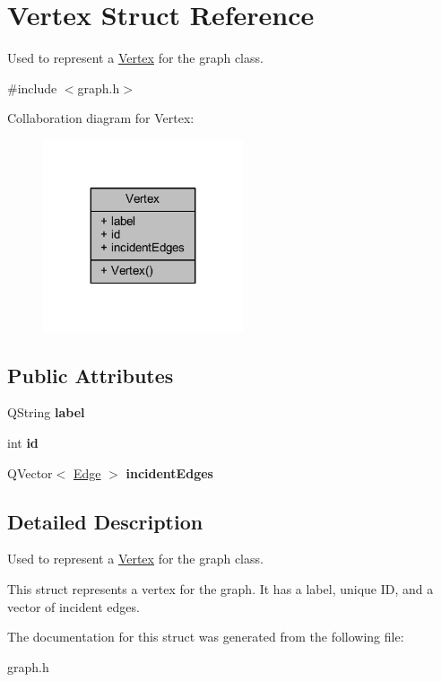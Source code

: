 \hypertarget{struct_vertex}{}\section{Vertex Struct Reference}
\label{struct_vertex}


Used to represent a \hyperlink{struct_vertex}{Vertex} for the graph class.  




{\ttfamily \#include $<$graph.\+h$>$}



Collaboration diagram for Vertex\+:\nopagebreak
\begin{figure}[H]
\begin{center}
\leavevmode
\includegraphics[width=167pt]{struct_vertex__coll__graph}
\end{center}
\end{figure}
\subsection*{Public Attributes}
\begin{DoxyCompactItemize}
\item 
\mbox{\label{struct_vertex_a60447a604e4decc34e1ef4f89909ac97}} 
Q\+String {\bfseries label}
\item 
\mbox{\label{struct_vertex_a2e69697726190f50c7fc040fb1ddac7a}} 
int {\bfseries id}
\item 
\mbox{\label{struct_vertex_a925bd1413228b69ba059c58bfa96b43c}} 
Q\+Vector$<$ \hyperlink{struct_edge}{Edge} $>$ {\bfseries incident\+Edges}
\end{DoxyCompactItemize}


\subsection{Detailed Description}
Used to represent a \hyperlink{struct_vertex}{Vertex} for the graph class. 

This struct represents a vertex for the graph. It has a label, unique ID, and a vector of incident edges. 

The documentation for this struct was generated from the following file\+:\begin{DoxyCompactItemize}
\item 
graph.\+h\end{DoxyCompactItemize}
